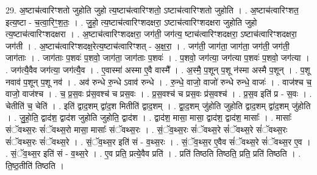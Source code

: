 \documentclass[17pt]{extarticle}
\begin{document}
29. अ॒ष्टाच॑त्वारिꣳशतो जुहोति जुहो त्य॒ष्टाच॑त्वारिꣳशतो॒ ऽष्टाच॑त्वारिꣳशतो जुहोति । . अ॒ष्टाच॑त्वारिꣳशत॒ इत्य॒ष्टा - च॒त्वा॒रिꣳ॒॒श॒तः॒ । . जु॒हो॒ त्य॒ष्टाच॑त्वारिꣳशदक्षरा॒ ऽष्टाच॑त्वारिꣳशदक्षरा जुहोति जुहो त्य॒ष्टाच॑त्वारिꣳशदक्षरा । . अ॒ष्टाच॑त्वारिꣳशदक्षरा॒ जग॑ती॒ जग॑त्य॒ ष्टाच॑त्वारिꣳशदक्षरा॒ ऽष्टाच॑त्वारिꣳशदक्षरा॒ जग॑ती । . अ॒ष्टाच॑त्वारिꣳशदक्ष॒रेत्य॒ष्टाच॑त्वारिꣳशत् - अ॒क्ष॒रा॒ । . जग॑ती॒ जाग॑ता॒ जाग॑ता॒ जग॑ती॒ जग॑ती॒ जाग॑ताः । . जाग॑ताः प॒शवः॑ प॒शवो॒ जाग॑ता॒ जाग॑ताः प॒शवः॑ । . प॒शवो॒ जग॑त्या॒ जग॑त्या प॒शवः॑ प॒शवो॒ जग॑त्या । . जग॑त्यै॒वैव जग॑त्या॒ जग॑त्यै॒व । . ए॒वास्मा॑ अस्मा ए॒वै वास्मै᳚ । . अ॒स्मै॒ प॒शून् प॒शू न॑स्मा अस्मै प॒शून् । . प॒शू नवाव॑ प॒शून् प॒शू नव॑ । . अव॑ रुन्धे रु॒न्धे ऽवाव॑ रुन्धे । . रु॒न्धे॒ वाजो॒ वाजो॑ रुन्धे रुन्धे॒ वाजः॑ । . वाज॑श्च च॒ वाजो॒ वाज॑श्च । . च॒ प्र॒स॒वः प्र॑स॒वश्च॑ च प्रस॒वः । . प्र॒स॒वश्च॑ च प्रस॒वः प्र॑स॒वश्च॑ । . प्र॒स॒व इति॑ प्र - स॒वः । . चेतीति॑ च॒ चेति॑ । . इति॑ द्वाद॒शम् द्वा॑द॒श मितीति॑ द्वाद॒शम् । . द्वा॒द॒शम् जु॑होति जुहोति द्वाद॒शम् द्वा॑द॒शम् जु॑होति । . जु॒हो॒ति॒ द्वाद॑श॒ द्वाद॑श जुहोति जुहोति॒ द्वाद॑श । . द्वाद॑श॒ मासा॒ मासा॒ द्वाद॑श॒ द्वाद॑श॒ मासाः᳚ । . मासाः᳚ संॅवथ्स॒रः सं॑ॅवथ्स॒रो मासा॒ मासाः᳚ संॅवथ्स॒रः । . सं॒ॅव॒थ्स॒रः सं॑ॅवथ्स॒रे सं॑ॅवथ्स॒रे सं॑ॅवथ्स॒रः सं॑ॅवथ्स॒रः सं॑ॅवथ्स॒रे । . सं॒ॅव॒थ्स॒र इति॑ सं - व॒थ्स॒रः । . सं॒ॅव॒थ्स॒र ए॒वैव सं॑ॅवथ्स॒रे सं॑ॅवथ्स॒र ए॒व । . सं॒ॅव॒थ्स॒र इति॑ सं - व॒थ्स॒रे । . ए॒व प्रति॒ प्रत्ये॒वैव प्रति॑ । . प्रति॑ तिष्ठति तिष्ठति॒ प्रति॒ प्रति॑ तिष्ठति । . ति॒ष्ठ॒तीति॑ तिष्ठति । \newline
\end{document}
